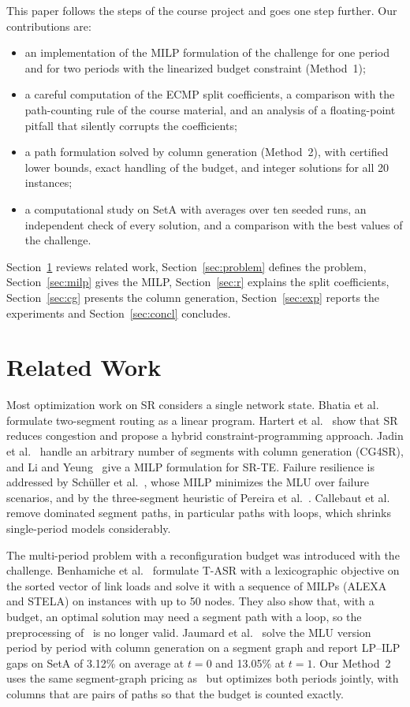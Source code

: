 \documentclass[conference]{IEEEtran}
\begin{document}
This paper follows the steps of the course project and goes one step further. Our contributions are:
\begin{itemize}
\item an implementation of the MILP formulation of the challenge for one period and for two periods with the linearized budget constraint (Method~1);
\item a careful computation of the ECMP split coefficients, a comparison with the path-counting rule of the course material, and an analysis of a floating-point pitfall that silently corrupts the coefficients;
\item a path formulation solved by column generation (Method~2), with certified lower bounds, exact handling of the budget, and integer solutions for all 20 instances;
\item a computational study on SetA with averages over ten seeded runs, an independent check of every solution, and a comparison with the best values of the challenge.
\end{itemize}
Section~\ref{sec:related} reviews related work, Section~\ref{sec:problem} defines the problem, Section~\ref{sec:milp} gives the MILP, Section~\ref{sec:r} explains the split coefficients, Section~\ref{sec:cg} presents the column generation, Section~\ref{sec:exp} reports the experiments and Section~\ref{sec:concl} concludes.

\section{Related Work}\label{sec:related}

Most optimization work on SR considers a single network state. Bhatia et al.~\cite{bhatia2015} formulate two-segment routing as a linear program. Hartert et al.~\cite{hartert2015} show that SR reduces congestion and propose a hybrid constraint-programming approach. Jadin et al.~\cite{cg4sr} handle an arbitrary number of segments with column generation (CG4SR), and Li and Yeung~\cite{li2020} give a MILP formulation for SR-TE. Failure resilience is addressed by Sch\"uller et al.~\cite{schuller2021}, whose MILP minimizes the MLU over failure scenarios, and by the three-segment heuristic of Pereira et al.~\cite{pereira2020}. Callebaut et al.~\cite{callebaut2023} remove dominated segment paths, in particular paths with loops, which shrinks single-period models considerably.

The multi-period problem with a reconfiguration budget was introduced with the challenge. Benhamiche et al.~\cite{benhamiche2026} formulate T-ASR with a lexicographic objective on the sorted vector of link loads and solve it with a sequence of MILPs (ALEXA and STELA) on instances with up to 50 nodes. They also show that, with a budget, an optimal solution may need a segment path with a loop, so the preprocessing of~\cite{callebaut2023} is no longer valid. Jaumard et al.~\cite{jaumard2026} solve the MLU version period by period with column generation on a segment graph and report LP--ILP gaps on SetA of 3.12\% on average at $t=0$ and 13.05\% at $t=1$. Our Method~2 uses the same segment-graph pricing as~\cite{cg4sr,jaumard2026} but optimizes both periods jointly, with columns that are pairs of paths so that the budget is counted exactly.
\end{document}
